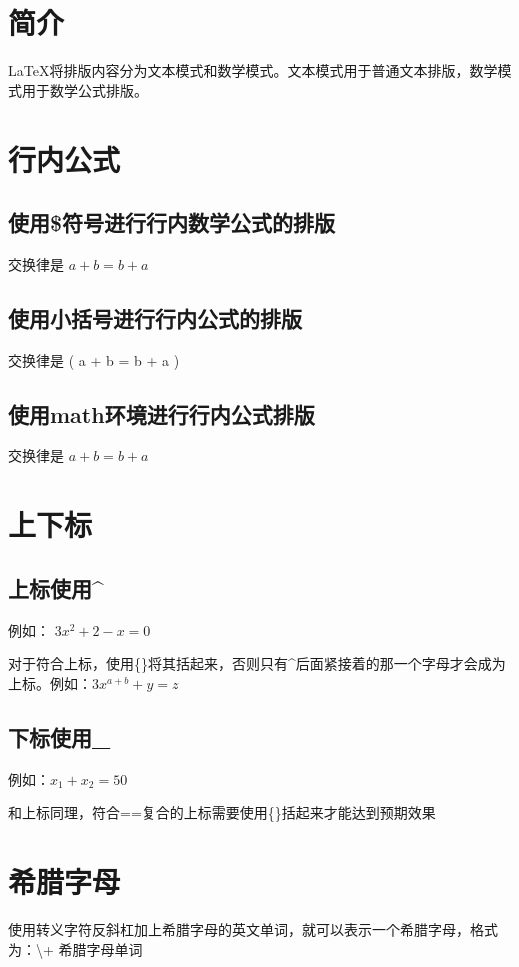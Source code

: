 \documentclass{ctexart}
\begin{document}
	
	\section{简介}
	LaTeX将排版内容分为文本模式和数学模式。文本模式用于普通文本排版，数学模式用于数学公式排版。
	
	\section{行内公式}
	
		\subsection{使用\$符号进行行内数学公式的排版}
		交换律是 $ a + b = b + a $
		
		\subsection{使用小括号进行行内公式的排版}
		交换律是 ( a + b = b + a )
		
		\subsection{使用math环境进行行内公式排版}
		交换律是
			\begin{math}
				a + b = b + a
			\end{math}
	\section{上下标}
	
		\subsection{上标使用\^{}}
		例如： $ 3x^2 + 2 - x = 0 $
		
		对于符合上标，使用\{\}将其括起来，否则只有\^{}后面紧接着的那一个字母才会成为上标。例如：$ 3x^{a + b} + y = z $
		
		\subsection{下标使用\_{}}
		例如：$ x_1 + x_2 = 50 $
		
		和上标同理，符合==复合的上标需要使用\{\}括起来才能达到预期效果
		
	\section{希腊字母}
	使用转义字符反斜杠加上希腊字母的英文单词，就可以表示一个希腊字母，格式为：\textbackslash + 希腊字母单词
	
\end{document}
